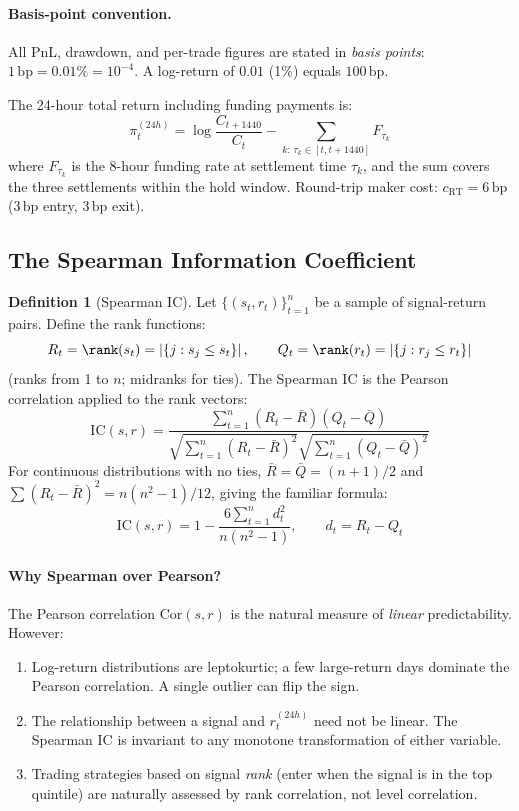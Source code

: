 \documentclass[12pt, a4paper]{article}
\theoremstyle{plain}
\theoremstyle{definition}
\newtheorem{definition}{Definition}[section]
\newcommand{\IC}{\mathrm{IC}}
\newcommand{\Cor}{\mathrm{Cor}}
\newcommand{\bp}{\,\mathrm{bp}}
\begin{document}
\paragraph{Basis-point convention.}
All PnL, drawdown, and per-trade figures are stated in \emph{basis points}:
$1\bp = 0.01\% = 10^{-4}$.  A log-return of $0.01$ (1\%) equals $100\bp$.

The 24-hour total return including funding payments is:
\begin{equation}
  \pi_t^{(24h)} = \log\frac{C_{t+1440}}{C_t}
                  - \sum_{k:\,\tau_k \in [t, t+1440]} F_{\tau_k}
\end{equation}
where $F_{\tau_k}$ is the 8-hour funding rate at settlement time $\tau_k$,
and the sum covers the three settlements within the hold window.
Round-trip maker cost: $c_{\mathrm{RT}} = 6\bp$ ($3\bp$ entry, $3\bp$ exit).

\subsection{The Spearman Information Coefficient}
\label{sec:IC}

\begin{definition}[Spearman IC]
  Let $\{(s_t, r_t)\}_{t=1}^n$ be a sample of signal-return pairs.
  Define the rank functions:
  \[
    R_t = \rank(s_t) = \left|\{j : s_j \leq s_t\}\right|, \qquad
    Q_t = \rank(r_t) = \left|\{j : r_j \leq r_t\}\right|
  \]
  (ranks from 1 to $n$; midranks for ties).  The Spearman IC is the Pearson
  correlation applied to the rank vectors:
  \begin{equation}
    \IC(s, r) = \frac{\sum_{t=1}^n (R_t - \bar{R})(Q_t - \bar{Q})}
                     {\sqrt{\sum_{t=1}^n (R_t - \bar{R})^2}
                      \sqrt{\sum_{t=1}^n (Q_t - \bar{Q})^2}}
    \label{eq:spearman}
  \end{equation}
  For continuous distributions with no ties, $\bar{R} = \bar{Q} = (n+1)/2$
  and $\sum (R_t - \bar{R})^2 = n(n^2-1)/12$, giving the familiar formula:
  \[
    \IC(s, r) = 1 - \frac{6\sum_{t=1}^n d_t^2}{n(n^2 - 1)},
    \qquad d_t = R_t - Q_t
  \]
\end{definition}

\paragraph{Why Spearman over Pearson?}
The Pearson correlation $\Cor(s, r)$ is the natural measure of
\emph{linear} predictability.  However:
\begin{enumerate}[noitemsep]
  \item Log-return distributions are leptokurtic; a few large-return days
        dominate the Pearson correlation.  A single outlier can flip the sign.
  \item The relationship between a signal and $r_t^{(24h)}$ need not be
        linear.  The Spearman IC is invariant to any monotone transformation
        of either variable.
  \item Trading strategies based on signal \emph{rank} (enter when the signal
        is in the top quintile) are naturally assessed by rank correlation,
        not level correlation.
\end{enumerate}
\end{document}

